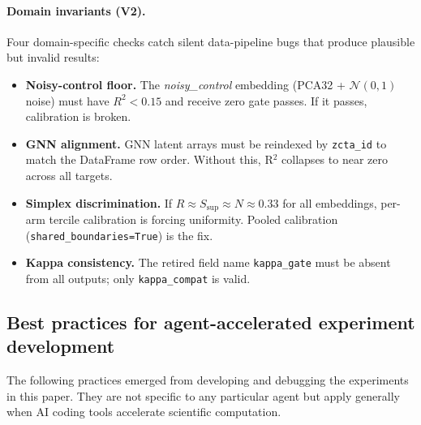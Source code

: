 \paragraph{Domain invariants (V2).}
Four domain-specific checks catch silent data-pipeline bugs that produce
plausible but invalid results:
\begin{itemize}
\item \textbf{Noisy-control floor.} The \textit{noisy\_control} embedding
  (PCA32 + $\mathcal{N}(0,1)$ noise) must have $R^2 < 0.15$ and receive
  zero gate passes. If it passes, calibration is broken.
\item \textbf{GNN alignment.} GNN latent arrays must be reindexed by
  \texttt{zcta\_id} to match the DataFrame row order. Without this, R$^2$
  collapses to near zero across all targets.
\item \textbf{Simplex discrimination.} If $R \approx S_\text{sup} \approx
  N \approx 0.33$ for all embeddings, per-arm tercile calibration is
  forcing uniformity. Pooled calibration (\texttt{shared\_boundaries=True})
  is the fix.
\item \textbf{Kappa consistency.} The retired field name
  \texttt{kappa\_gate} must be absent from all outputs; only
  \texttt{kappa\_compat} is valid.
\end{itemize}

\subsection{Best practices for agent-accelerated experiment development}
\label{app:best-practices}

The following practices emerged from developing and debugging the
experiments in this paper. They are not specific to any particular agent
but apply generally when AI coding tools accelerate scientific
computation.

